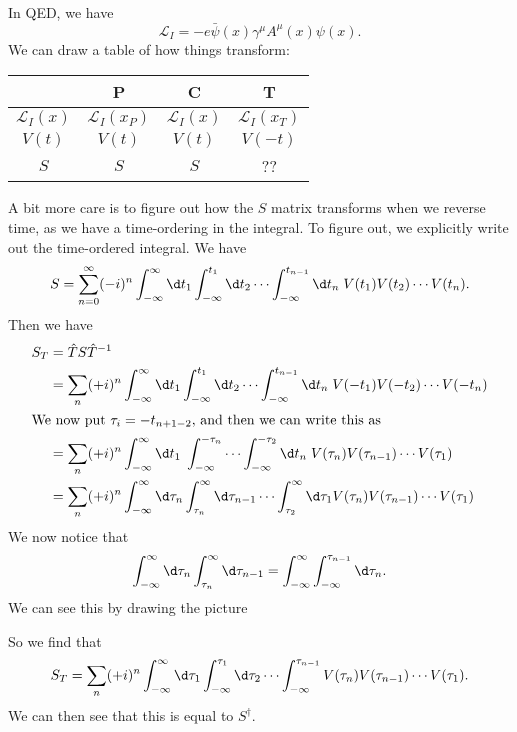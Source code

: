 \documentclass[a4paper]{article}
\begin{document}
\begin{eg}
  In QED, we have
  \[
    \mathcal{L}_I = - e \bar\psi (x) \gamma^\mu A^\mu (x) \psi(x).
  \]
  We can draw a table of how things transform:
  \begin{center}
    \begin{tabular}{cccc}
      \toprule
      & P & C & T\\
      \midrule
      $\mathcal{L}_I(x)$ & $\mathcal{L}_I(x_P)$ & $\mathcal{L}_I(x)$ & $\mathcal{L}_I(x_T)$\\
      $V(t)$ & $V(t)$ & $ V(t)$ & $V(-t)$ \\
      $S$ & $S$ & $S$ & ??\\
      \bottomrule
    \end{tabular}
  \end{center}
  A bit more care is to figure out how the $S$ matrix transforms when we reverse time, as we have a time-ordering in the integral. To figure out, we explicitly write out the time-ordered integral. We have
  \[
    S = \sum_{n = 0}^\infty (-i)^n \int_{-\infty}^\infty \d t_1 \int_{-\infty}^{t_1} \d t_2 \cdots \int_{-\infty}^{t_{n - 1}} \d t_n\; V(t_1) V(t_2) \cdots V(t_n).
  \]
  Then we have
  \begin{align*}
    S_T &= \hat{T} S\hat{T}^{-1} \\
    &= \sum_n (+i)^n \int_{-\infty}^\infty \d t_1 \int_{-\infty}^{t_1} \d t_2 \cdots \int_{-\infty}^{t_{n - 1}} \d t_n\; V(-t_1) V(-t_2) \cdots V(-t_n)\\
    \intertext{We now put $\tau_i = -t_{n + 1 - 2}$, and then we can write this as}
    &= \sum_n (+i)^n \int_{-\infty}^\infty \d t_1 \; \int_{-\infty}^{-\tau_n} \cdots \int_{-\infty}^{-\tau_2} \d t_n\; V(\tau_n) V(\tau_{n - 1}) \cdots V(\tau_1)\\
    &= \sum_n (+i)^n \int_{-\infty}^\infty \d \tau_n \int_{\tau_n}^\infty \d \tau_{n - 1} \cdots \int_{\tau_2}^\infty \d \tau_1 V(\tau_n) V(\tau_{n - 1}) \cdots V(\tau_1)
  \end{align*}
  We now notice that
  \[
    \int_{-\infty}^\infty \d \tau_n \int_{\tau_n}^\infty \d \tau_{n - 1} = \int_{-\infty}^\infty \int_{-\infty}^{\tau_{n - 1}} \d \tau_n.
  \]
  We can see this by drawing the picture
  \begin{center}
  \end{center}
  So we find that
  \[
    S_T = \sum_n (+i)^n \int_{-\infty}^\infty \d \tau_1 \int_{-\infty}^{\tau_1} \d \tau_2 \cdots \int_{-\infty}^{\tau_{n - 1}} V(\tau_n) V(\tau_{n - 1}) \cdots V(\tau_1).
  \]
  We can then see that this is equal to $S^\dagger$.


\end{eg}
\end{document}
